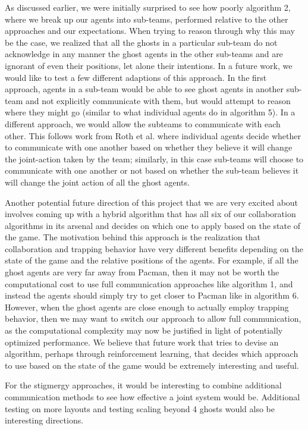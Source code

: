 \documentclass[11pt]{article}
\begin{document}
\begin{multicols}{2}
As discussed earlier, we were initially surprised to see how poorly algorithm 2, where we break up our agents into sub-teams, performed relative to the other approaches and our expectations. When trying to reason through why this may be the case, we realized that all the ghosts in a particular sub-team do not acknowledge in any manner the ghost agents in the other sub-teams and are ignorant of even their positions, let alone their intentions. In a future work, we would like to test a few different adaptions of this approach. In the first approach, agents in a sub-team would be able to see ghost agents in another sub-team and not explicitly communicate with them, but would attempt to reason where they might go (similar to what individual agents do in algorithm 5). In a different approach, we would allow the subteams to communicate with each other. This follows work from Roth et al. where individual agents decide whether to communicate with one another based on whether they believe it will change the joint-action taken by the team; similarly, in this case sub-teams will choose to communicate with one another or not based on whether the sub-team believes it will change the joint action of all the ghost agents.

Another potential future direction of this project that we are very excited about involves coming up with a hybrid algorithm that has all six of our collaboration algorithms in its arsenal and decides on which one to apply based on the state of the game. The motivation behind this approach is the realization that collaboration and trapping behavior have very different benefits depending on the state of the game and the relative positions of the agents. For example, if all the ghost agents are very far away from Pacman, then it may not be worth the computational cost to use full communication approaches like algorithm 1, and instead the agents should simply try to get closer to Pacman like in algorithm 6. However, when the ghost agents are close enough to actually employ trapping behavior, then we may want to switch our approach to allow full communication, as the computational complexity may now be justified in light of potentially optimized performance. We believe that future work that tries to devise an algorithm, perhaps through reinforcement learning, that decides which approach to use based on the state of the game would be extremely interesting and useful.

For the stigmergy approaches, it would be interesting to combine additional communication methods to see how effective a joint system would be.  Additional testing on more layouts and testing scaling beyond 4 ghosts would also be interesting directions.


\end{multicols}
\end{document}
